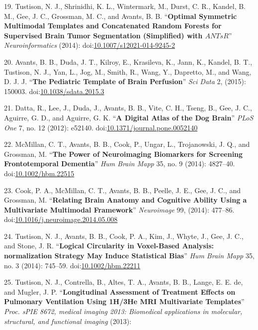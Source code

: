 \documentclass[11pt,]{article}
\begin{document}
19. Tustison, N. J., Shrinidhi, K. L., Wintermark, M., Durst, C. R.,
Kandel, B. M., Gee, J. C., Grossman, M. C., and Avants, B. B.
``\textbf{Optimal Symmetric Multimodal Templates and Concatenated Random
Forests for Supervised Brain Tumor Segmentation (Simplified) with
$ANTsR$}'' \emph{Neuroinformatics} (2014):
doi:\href{http://dx.doi.org/10.1007/s12021-014-9245-2}{10.1007/s12021-014-9245-2}

20. Avants, B. B., Duda, J. T., Kilroy, E., Krasileva, K., Jann, K.,
Kandel, B. T., Tustison, N. J., Yan, L., Jog, M., Smith, R., Wang, Y.,
Dapretto, M., and Wang, D. J. J. ``\textbf{The Pediatric Template of
Brain Perfusion}'' \emph{Sci Data} 2, (2015): 150003.
doi:\href{http://dx.doi.org/10.1038/sdata.2015.3}{10.1038/sdata.2015.3}

21. Datta, R., Lee, J., Duda, J., Avants, B. B., Vite, C. H., Tseng, B.,
Gee, J. C., Aguirre, G. D., and Aguirre, G. K. ``\textbf{A Digital Atlas
of the Dog Brain}'' \emph{PLoS One} 7, no. 12 (2012): e52140.
doi:\href{http://dx.doi.org/10.1371/journal.pone.0052140}{10.1371/journal.pone.0052140}

22. McMillan, C. T., Avants, B. B., Cook, P., Ungar, L., Trojanowski, J.
Q., and Grossman, M. ``\textbf{The Power of Neuroimaging Biomarkers for
Screening Frontotemporal Dementia}'' \emph{Hum Brain Mapp} 35, no. 9
(2014): 4827--40.
doi:\href{http://dx.doi.org/10.1002/hbm.22515}{10.1002/hbm.22515}

23. Cook, P. A., McMillan, C. T., Avants, B. B., Peelle, J. E., Gee, J.
C., and Grossman, M. ``\textbf{Relating Brain Anatomy and Cognitive
Ability Using a Multivariate Multimodal Framework}'' \emph{Neuroimage}
99, (2014): 477--86.
doi:\href{http://dx.doi.org/10.1016/j.neuroimage.2014.05.008}{10.1016/j.neuroimage.2014.05.008}

24. Tustison, N. J., Avants, B. B., Cook, P. A., Kim, J., Whyte, J.,
Gee, J. C., and Stone, J. R. ``\textbf{Logical Circularity in
Voxel-Based Analysis: normalization Strategy May Induce Statistical
Bias}'' \emph{Hum Brain Mapp} 35, no. 3 (2014): 745--59.
doi:\href{http://dx.doi.org/10.1002/hbm.22211}{10.1002/hbm.22211}

25. Tustison, N. J., Contrella, B., Altes, T. A., Avants, B. B., Lange,
E. E. de, and Mugler, J. P. ``\textbf{Longitudinal Assessment of
Treatment Effects on Pulmonary Ventilation Using 1H/3He MRI Multivariate
Templates}'' \emph{Proc. sPIE 8672, medical imaging 2013: Biomedical
applications in molecular, structural, and functional imaging} (2013):
\end{document}
